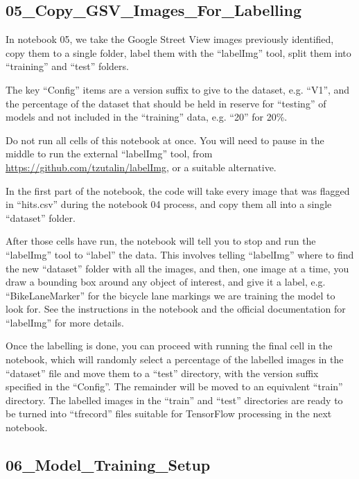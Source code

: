 \documentclass[11pt,twoside]{report}
\begin{document}
\subsection{05\_Copy\_GSV\_Images\_For\_Labelling}
\label{aj05}

In notebook 05, we take the Google Street View images previously identified, copy them to a single folder, label them with the ``labelImg'' tool, split them into ``training'' and ``test'' folders.

The key ``Config'' items are a version suffix to give to the dataset, e.g. ``V1'', and the percentage of the dataset that should be held in reserve for ``testing'' of models and not included in the ``training'' data, e.g. ``20'' for 20\%.

Do not run all cells of this notebook at once.  You will need to pause in the middle to run the external ``labelImg'' tool, from \url{https://github.com/tzutalin/labelImg}, or a suitable alternative.

In the first part of the notebook, the code will take every image that was flagged in ``hits.csv'' during the notebook 04 process, and copy them all into a single ``dataset'' folder.

After those cells have run, the notebook will tell you to stop and run the ``labelImg'' tool to ``label'' the data.  This involves telling ``labelImg'' where to find the new ``dataset'' folder with all the images, and then, one image at a time, you draw a bounding box around any object of interest, and give it a label, e.g. ``BikeLaneMarker'' for the bicycle lane markings we are training the model to look for.  See the instructions in the notebook and the official documentation for ``labelImg'' for more details.

Once the labelling is done, you can proceed with running the final cell in the notebook, which will randomly select a percentage of the labelled images in the ``dataset'' file and move them to a ``test'' directory, with the version suffix specified in the ``Config''.  The remainder will be moved to an equivalent ``train'' directory.  The labelled images in the ``train'' and ``test'' directories are ready to be turned into ``tfrecord'' files suitable for TensorFlow processing in the next notebook.


\subsection{06\_Model\_Training\_Setup}
\label{aj06}
\end{document}

